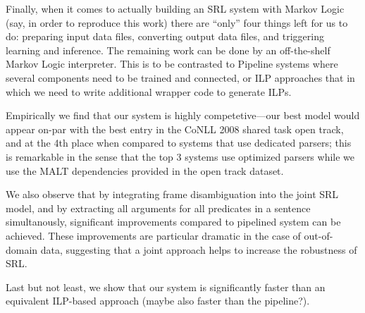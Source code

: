 Finally, when it comes to actually building an SRL system with Markov
Logic (say, in order to reproduce this work) there are ``only''
four things left for us to do: preparing input data files, converting
output data files, and triggering learning and inference. The remaining
work can be done by an off-the-shelf Markov Logic interpreter. This
is to be contrasted to Pipeline systems where several components need
to be trained and connected, or ILP approaches that in which we need
to write additional wrapper code to generate ILPs.

Empirically we find that our system is highly competetive---our best
model would appear on-par with the best entry in the CoNLL 2008
shared task open track, and at the 4th place when compared to systems
that use dedicated parsers; this is remarkable in the sense that the
top 3 systems use optimized parsers while we use the MALT
dependencies provided in the open track dataset.  


We also observe that by integrating frame disambiguation into the
joint SRL model, and by extracting all arguments for all predicates in a
sentence simultanously, significant improvements compared to pipelined
system can be achieved. These improvements are particular dramatic in
the case of out-of-domain data, suggesting that a joint approach helps
to increase the robustness of SRL. 

Last but not least, we show that our system is significantly faster
than an equivalent ILP-based approach (maybe also faster than the
pipeline?). 

 


